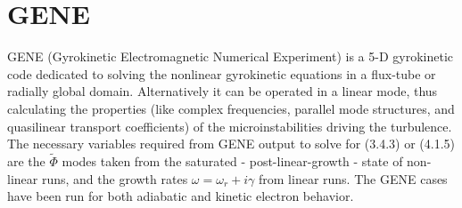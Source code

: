\documentclass[12pt]{article}
\numberwithin{equation}{subsection}
\begin{document}
\section{GENE}
   \quad GENE (Gyrokinetic Electromagnetic Numerical Experiment) is a 5-D gyrokinetic code dedicated to solving the nonlinear gyrokinetic equations
in a flux-tube or radially global domain. Alternatively it can be operated in a linear mode, thus calculating the properties (like complex frequencies,
parallel mode structures, and quasilinear transport coefficients) of the microinstabilities driving the turbulence.\cite{GENE} The necessary variables
required from GENE output to solve for (3.4.3) or (4.1.5) are the $\widetilde{\Phi}$ modes taken from the saturated - post-linear-growth - state of non-linear
runs, and the growth rates $\omega = \omega_r + i\gamma$ from linear runs. The GENE cases have been run for both adiabatic and kinetic electron behavior.
\end{document}
